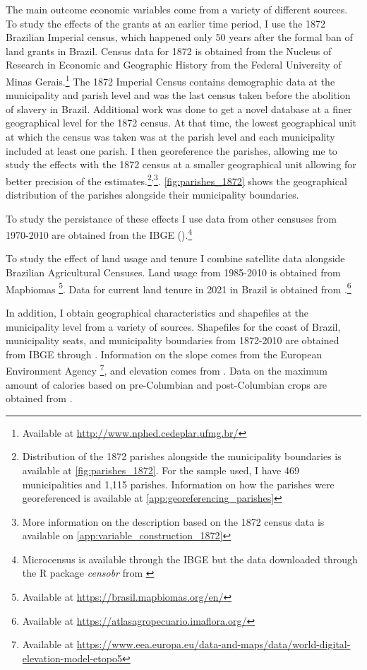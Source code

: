\documentclass{article}
\begin{document}
The main outcome economic variables come from a variety of different sources.
To study the effects of the grants at an earlier time period, I use the 1872 Brazilian Imperial census, which happened only 50 years after the formal ban of land grants in Brazil.
Census data for 1872 is obtained from the Nucleus of Research in Economic and Geographic History from the Federal University of Minas Gerais.\footnote{
  Available at \url{http://www.nphed.cedeplar.ufmg.br/}}
The 1872 Imperial Census contains demographic data at the municipality and parish level and was the last census taken before the abolition of slavery in Brazil. 
Additional work was done to get a novel database at a finer geographical level for the 1872 census.
At that time, the lowest geographical unit at which the census was taken was at the parish level and each municipality included at least one parish.
I then georeference the parishes, allowing me to study the effects with the 1872 census at a smaller geographical unit allowing for better precision of the estimates.\footnote{Distribution of the 1872 parishes alongside the municipality boundaries is available at \autoref{fig:parishes_1872}. For the sample used, I have 469 municipalities and 1,115 parishes. Information on how the parishes were georeferenced is available at \autoref{app:georeferencing_parishes}}\textsuperscript{,}\footnote{More information on the description based on the 1872 census data is available on \autoref{app:variable_construction_1872}}. \autoref{fig:parishes_1872} shows the geographical distribution of the parishes alongside their municipality boundaries. 

To study the persistance of these effects I use data from other censuses from 1970-2010 are obtained from the IBGE (\textit{}).\footnote{Microcensus is available through the IBGE but the data downloaded through the R package \textit{censobr} from \textcite{Pereira2023-qv}}

To study the effect of land usage and tenure I combine satellite data alongside Brazilian Agricultural Censuses. 
Land usage from 1985-2010 is obtained from Mapbiomas \parencite{Souza2020-kb}\footnote{
  Available at \url{https://brasil.mapbiomas.org/en/}}.
Data for current land tenure in 2021 in Brazil is obtained from \textcite{Sparovek2019-dn}.\footnote{
  Available at \url{https://atlasagropecuario.imaflora.org/}}

In addition, I obtain geographical characteristics and shapefiles at the municipality level from a variety of sources. 
Shapefiles for the coast of Brazil, municipality seats, and municipality boundaries from 1872-2010 are obtained from IBGE through \textcite{Pereira2023-qq}.
Information on the slope comes from the European Environment Agency
\footnote{
  Available at \url{https://www.eea.europa.eu/data-and-maps/data/world-digital-elevation-model-etopo5}}, and elevation comes from \textcite{Amatulli2018-gl}.
Data on the maximum amount of calories based on pre-Columbian and post-Columbian crops are obtained from \textcite{Galor2016-ba}. 
\end{document}
